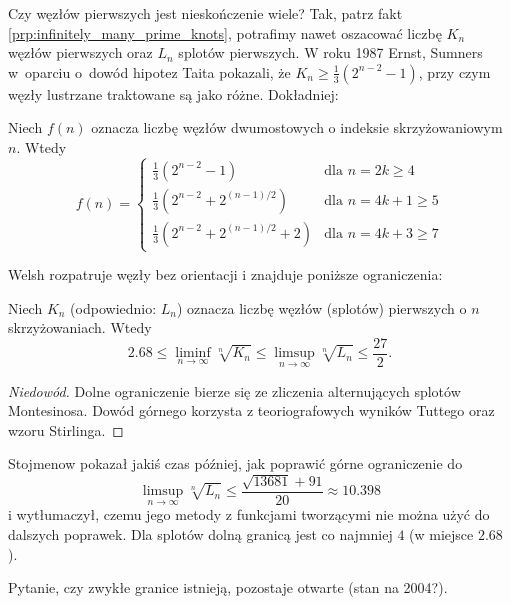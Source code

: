 Czy węzłów pierwszych jest nieskończenie wiele?
Tak, patrz fakt \ref{prp:infinitely_many_prime_knots}, potrafimy nawet oszacować liczbę $K_n$ węzłów pierwszych oraz $L_n$ splotów pierwszych.
W roku 1987 Ernst, Sumners \cite{ernst1987} w~oparciu o~dowód hipotez Taita pokazali, że $K_n \ge \frac 1 3 (2^{n- 2} - 1)$, przy czym węzły lustrzane traktowane są jako różne.
%
%
Dokładniej:

\begin{proposition}
%
    Niech $f(n)$ oznacza liczbę węzłów dwumostowych o indeksie skrzyżowaniowym $n$.
    Wtedy
    \begin{equation}
        f(n) = \begin{cases}
        \frac 13 (2^{n-2} - 1) & \text{dla } n = 2k \ge 4 \\
        \frac 13 (2^{n-2} + 2^{(n-1)/2}) & \text{dla } n = 4k + 1 \ge 5 \\
        \frac 13 (2^{n-2} + 2^{(n-1)/2} + 2) & \text{dla } n = 4k + 3 \ge 7
        \end{cases}
    \end{equation}
\end{proposition}

Welsh \cite{welsh1992} rozpatruje węzły bez orientacji i znajduje poniższe ograniczenia:
%

\begin{proposition}
    Niech $K_n$ (odpowiednio: $L_n$) oznacza liczbę węzłów (splotów) pierwszych o $n$ skrzyżowaniach.
    Wtedy
    \begin{equation}
        2.68 \le \liminf_{n \to \infty} \sqrt[n]{K_n} \le \limsup_{n \to \infty} \sqrt[n]{L_n} \le \frac {27}{2}.
    \end{equation}
\end{proposition}

\begin{proof}[Niedowód]
    Dolne ograniczenie bierze się ze zliczenia alternujących splotów Montesinosa.
    Dowód górnego korzysta z teoriografowych wyników Tuttego oraz wzoru Stirlinga.
\end{proof}

Stojmenow \cite{stoimenowb2004} pokazał jakiś czas później, jak poprawić górne ograniczenie do
\begin{equation}
    \limsup_{n \to \infty} \sqrt[n]{L_n} \le \frac{\sqrt{13681} + 91}{20} \approx 10.398
\end{equation}
i wytłumaczył, czemu jego metody z funkcjami tworzącymi nie można użyć do dalszych poprawek.
%
Dla splotów dolną granicą jest co najmniej $4$ (w miejsce $2.68$).

Pytanie, czy zwykłe granice istnieją, pozostaje otwarte (stan na 2004?).



